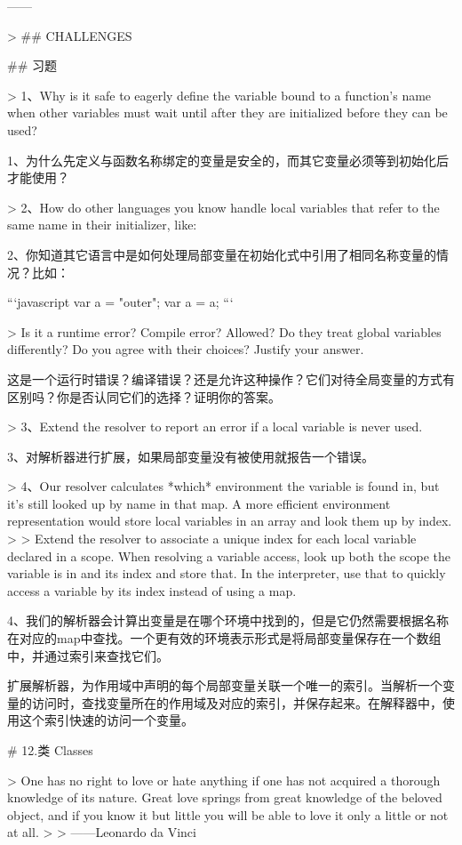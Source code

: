 \documentclass[cn,11pt,chinese]{elegantbook}
\begin{document}
{{{{{{{{{{{{{{{{{{------

> ## CHALLENGES

## 习题

> 1、Why is it safe to eagerly define the variable bound to a function’s name when other variables must wait until after they are initialized before they can be used?

1、为什么先定义与函数名称绑定的变量是安全的，而其它变量必须等到初始化后才能使用？

> 2、How do other languages you know handle local variables that refer to the same name in their initializer, like:

2、你知道其它语言中是如何处理局部变量在初始化式中引用了相同名称变量的情况？比如：

```javascript
var a = "outer";
{
  var a = a;
}
```

> Is it a runtime error? Compile error? Allowed? Do they treat global variables differently? Do you agree with their choices? Justify your answer.

这是一个运行时错误？编译错误？还是允许这种操作？它们对待全局变量的方式有区别吗？你是否认同它们的选择？证明你的答案。

> 3、Extend the resolver to report an error if a local variable is never used.

3、对解析器进行扩展，如果局部变量没有被使用就报告一个错误。

> 4、Our resolver calculates *which* environment the variable is found in, but it’s still looked up by name in that map. A more efficient environment representation would store local variables in an array and look them up by index.
>
> Extend the resolver to associate a unique index for each local variable declared in a scope. When resolving a variable access, look up both the scope the variable is in and its index and store that. In the interpreter, use that to quickly access a variable by its index instead of using a map.

4、我们的解析器会计算出变量是在哪个环境中找到的，但是它仍然需要根据名称在对应的map中查找。一个更有效的环境表示形式是将局部变量保存在一个数组中，并通过索引来查找它们。

扩展解析器，为作用域中声明的每个局部变量关联一个唯一的索引。当解析一个变量的访问时，查找变量所在的作用域及对应的索引，并保存起来。在解释器中，使用这个索引快速的访问一个变量。

# 12.类 Classes

> One has no right to love or hate anything if one has not acquired a thorough knowledge of its nature. Great love springs from great knowledge of the beloved object, and if you know it but little you will be able to love it only a little or not at all.
>
> ​																																					——Leonardo da Vinci

}}}}}}}}}}}}}}}}}}
\end{document}

